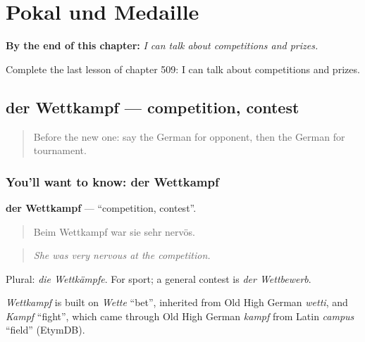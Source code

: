 
\chapter{Pokal und Medaille}
\label{ch:ge-pokal-und-medaille}

\begin{chapteropening}
\textbf{By the end of this chapter:} \emph{I can talk about competitions and prizes.}

Complete the last lesson of chapter 509: I can talk about competitions and prizes.
\end{chapteropening}

\section[der Wettkampf]{der Wettkampf — competition, contest}

\label{lesson:GE-C509-wettkampf}



\begin{quote}
Before the new one: say the German for opponent, then the German for tournament.
\end{quote}

\subsection*{You'll want to know: der Wettkampf}
\textbf{der Wettkampf} — \textquotedblleft{}competition, contest\textquotedblright{}.

\begin{quote}
Beim Wettkampf war sie sehr nervös.
\end{quote}

\begin{quote}
\emph{She was very nervous at the competition.}
\end{quote}

Plural: \emph{die Wettkämpfe}. For sport; a general contest is \emph{der Wettbewerb}.

\begin{cousinweb}
\emph{Wettkampf} is built on \emph{Wette} \textquotedblleft{}bet\textquotedblright{}, inherited from Old High German \emph{wetti}, and \emph{Kampf} \textquotedblleft{}fight\textquotedblright{}, which came through Old High German \emph{kampf} from Latin \emph{campus} \textquotedblleft{}field\textquotedblright{} (EtymDB).
\end{cousinweb}

